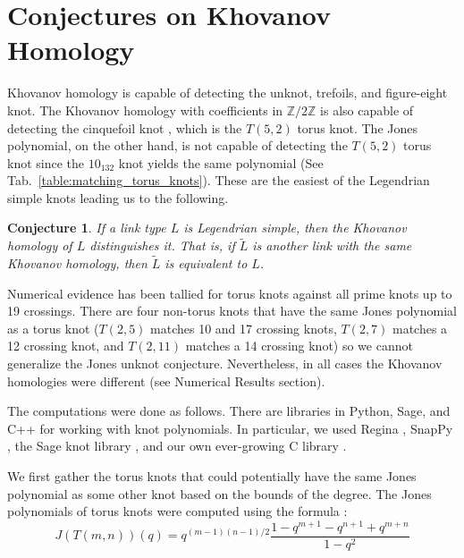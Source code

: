 \documentclass{article}
\theoremstyle{plain}
\newtheorem{conjecture}{Conjecture}
\begin{document}
    \section{Conjectures on Khovanov Homology}
        Khovanov homology is capable of detecting the
        unknot, trefoils, and figure-eight knot. The Khovanov homology with
        coefficients in $\mathbb{Z}/2\mathbb{Z}$ is also capable of detecting
        the cinquefoil knot \cite{BaldwinYingSivekCinquefoilKhovanov},
        which is the $T(5,2)$ torus knot. The Jones
        polynomial, on the other hand, is not capable of detecting the
        $T(5,2)$ torus knot since the $10_{132}$ knot yields the same
        polynomial (See Tab.~\ref{table:matching_torus_knots}).
        These are the easiest of the Legendrian simple knots
        leading us to the following.
        \begin{conjecture}
            If a link type $L$ is Legendrian simple, then the Khovanov homology
            of $L$ distinguishes it. That is, if $\tilde{L}$
            is another link with the same Khovanov homology, then $\tilde{L}$ is
            equivalent to $L$.
        \end{conjecture}
        Numerical evidence has been tallied for torus knots
        against all prime knots up to 19 crossings. There are four
        non-torus knots that have the same Jones polynomial as a torus knot
        ($T(2,5)$ matches 10 and 17 crossing knots, $T(2,7)$
        matches a 12 crossing knot, and $T(2,11)$ matches a 14 crossing knot)
        so we cannot generalize the Jones unknot conjecture. Nevertheless, in
        all cases the Khovanov homologies were different
        (see Numerical Results section).
        \par\hfill\par
        The computations were done as follows. There are libraries in Python,
        Sage, and C++ for working with knot polynomials. In particular, we used
        Regina \cite{regina}, SnapPy \cite{SnapPy}, the Sage knot library
        \cite{sage}, and our own ever-growing C library
        \cite{MaguireLibtmpl}.
        \par\hfill\par
        We first gather the torus knots that could potentially have the same
        Jones polynomial as some other knot based on the bounds of the degree.
        The Jones polynomials of torus knots were computed using the formula
        \cite{jonesfordummyvjones}:
        \begin{equation}
            \label{eqn:jones_poly_torus}%
            J(T(m,n))(q)=q^{(m-1)(n-1)/2}
                \frac{1-q^{m+1}-q^{n+1}+q^{m+n}}{1-q^{2}}
        \end{equation}
\end{document}
